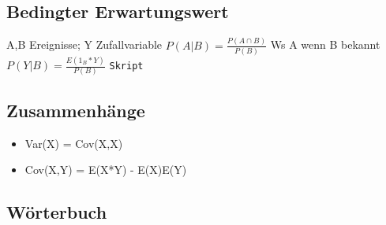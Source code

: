 \documentclass[11pt]{article}
\begin{document}
\subsection{Bedingter Erwartungswert}
\label{sec-3-3}

A,B Ereignisse; Y Zufallvariable
$P(A|B) = \frac{P(A \cap B)}{P(B)}$ Ws A wenn B bekannt
$P(Y|B) = \frac{E(1_{B} * Y)}{P(B)}$
\texttt{Skript}
\subsection{Zusammenhänge}
\label{sec-3-4}

\begin{itemize}
\item Var(X) = Cov(X,X)
\item Cov(X,Y) = E(X*Y) - E(X)E(Y)
\end{itemize}
\subsection{Wörterbuch}
\label{sec-3-5}
\end{document}
